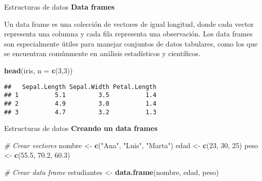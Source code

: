 \documentclass[
  ignorenonframetext,
]{beamer}
\newenvironment{Shaded}{\begin{snugshade}}{\end{snugshade}}
\newcommand{\AttributeTok}[1]{\textcolor[rgb]{0.13,0.29,0.53}{#1}}
\newcommand{\CommentTok}[1]{\textcolor[rgb]{0.56,0.35,0.01}{\textit{#1}}}
\newcommand{\DecValTok}[1]{\textcolor[rgb]{0.00,0.00,0.81}{#1}}
\newcommand{\FloatTok}[1]{\textcolor[rgb]{0.00,0.00,0.81}{#1}}
\newcommand{\FunctionTok}[1]{\textcolor[rgb]{0.13,0.29,0.53}{\textbf{#1}}}
\newcommand{\NormalTok}[1]{#1}
\newcommand{\OtherTok}[1]{\textcolor[rgb]{0.56,0.35,0.01}{#1}}
\newcommand{\StringTok}[1]{\textcolor[rgb]{0.31,0.60,0.02}{#1}}
\begin{document}
\begin{frame}[fragile]{Estructuras de datos}
\label{estructuras-de-datos-2}
\textbf{Data frames}

Un data frame es una colección de vectores de igual longitud, donde cada
vector representa una columna y cada fila representa una observación.
Los data frames son especialmente útiles para manejar conjuntos de datos
tabulares, como los que se encuentran comúnmente en análisis
estadísticos y científicos.

\begin{Shaded}
\begin{Highlighting}[]
\FunctionTok{head}\NormalTok{(iris, }\AttributeTok{n =} \FunctionTok{c}\NormalTok{(}\DecValTok{3}\NormalTok{,}\DecValTok{3}\NormalTok{))}
\end{Highlighting}
\end{Shaded}

\begin{verbatim}
##   Sepal.Length Sepal.Width Petal.Length
## 1          5.1         3.5          1.4
## 2          4.9         3.0          1.4
## 3          4.7         3.2          1.3
\end{verbatim}
\end{frame}

\begin{frame}[fragile]{Estructuras de datos}
\label{estructuras-de-datos-3}
\textbf{Creando un data frames}

\begin{Shaded}
\begin{Highlighting}[]
\CommentTok{\# Crear vectores}
\NormalTok{nombre }\OtherTok{\textless{}{-}} \FunctionTok{c}\NormalTok{(}\StringTok{"Ana"}\NormalTok{, }\StringTok{"Luis"}\NormalTok{, }\StringTok{"Marta"}\NormalTok{)}
\NormalTok{edad }\OtherTok{\textless{}{-}} \FunctionTok{c}\NormalTok{(}\DecValTok{23}\NormalTok{, }\DecValTok{30}\NormalTok{, }\DecValTok{25}\NormalTok{)}
\NormalTok{peso }\OtherTok{\textless{}{-}} \FunctionTok{c}\NormalTok{(}\FloatTok{55.5}\NormalTok{, }\FloatTok{70.2}\NormalTok{, }\FloatTok{60.3}\NormalTok{)}

\CommentTok{\# Crear data frame}
\NormalTok{estudiantes }\OtherTok{\textless{}{-}} \FunctionTok{data.frame}\NormalTok{(nombre, edad, peso)}
\end{Highlighting}
\end{Shaded}
\end{frame}
\end{document}
